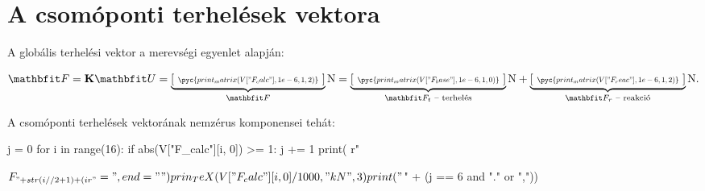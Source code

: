 \section{A csomóponti terhelések vektora}

A globális terhelési vektor a merevségi egyenlet alapján:
\begin{myframe}
  \begin{equation}
    \rvec F
    = \rmat K \rvec U
    =
    \siplaces{2} \sisetup{drop-zero-decimal}
    \underbrace{\left[
        \scalebox{.667}{$\begin{array}{c}
              \pyc{print_matrix(V["F_calc"], 1e-6, 1, 2)}
            \end{array}$}
        \right]}_{\rvec F}
    \mathrm N
    = \siplaces{0}
    \underbrace{\left[
        \scalebox{.667}{$\begin{array}{c}
              \pyc{print_matrix(V["F_base"], 1e-6, 1, 0)}
            \end{array}$}
        \right]}_{\rvec F_t \text{ -- terhelés}}
    \mathrm N
    + \siplaces{2}
    \underbrace{\left[
        \scalebox{.667}{$\begin{array}{c}
              \pyc{print_matrix(V["F_reac"], 1e-6, 1, 2)}
            \end{array}$}
        \right]}_{\rvec F_r \text{ -- reakció}}
    \mathrm N
    \text.
  \end{equation}
\end{myframe}

A csomóponti terhelések vektorának nemzérus komponensei tehát:
\begin{myframe}
  \vspace{-.66em}
  \begin{multicols}{3}
    \begin{itemize}
      \begin{python}
j = 0
for i in range(16):
    if abs(V["F_calc"][i, 0]) >= 1:
        j += 1
        print(
            r"\item $F_{" + str(i // 2 + 1) + 
            (i %
            r"} = ", end=""
        )
        prin_TeX(V["F_calc"][i, 0] / 1000, "kN", 3)
        print("$" + (j == 6 and "." or ","))
      \end{python}
    \end{itemize}
  \end{multicols}
\end{myframe}
